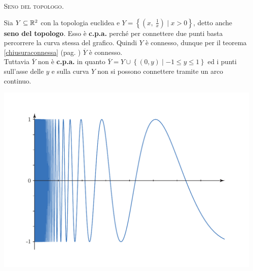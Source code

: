 \begin{example}\textsc{Seno del topologo.}\\
\begin{minipage}{0.47\textwidth}
Sia $Y\subseteq \mathbb{R}^2$ con la topologia euclidea e $Y=\left\{ \left( x,\ \frac{1}{x} \right) \mid x>0 \right\}$, detto anche \textbf{seno del topologo}. Esso è \textbf{c.p.a.} perché per connettere due punti basta percorrere la curva stessa del grafico. Quindi $Y$ è connesso, dunque per il teorema \ref{chiusuraconnessa} (pag. \pageref{chiusuraconnessa}) $\overline{Y}$ è connesso.\\
Tuttavia $\overline{Y}$ non è \textbf{c.p.a.} in quanto $\overline{Y}=Y\cup \left\{ (0,y) \mid -1\leq y \leq 1 \right\}$ ed i punti sull'asse delle $y$ e sulla curva $Y$ non si possono connettere tramite un arco continuo.
\end{minipage}
\hspace{-7mm}
\begin{minipage}{0.52\textwidth}
	\includegraphics[trim=0cm 0.5cm 0.5cm 1.25cm,clip,scale=0.50]{images/topologistsine.pdf}
\end{minipage}
\end{example}
